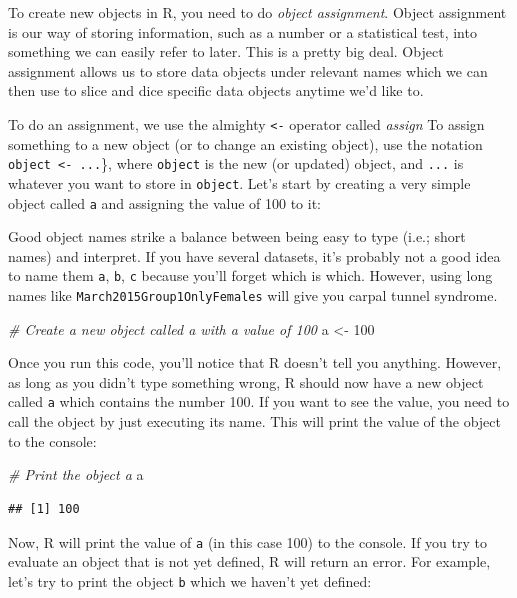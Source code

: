 \documentclass[
]{book}
\newenvironment{Shaded}{\begin{snugshade}}{\end{snugshade}}
\newcommand{\CommentTok}[1]{\textcolor[rgb]{0.56,0.35,0.01}{\textit{#1}}}
\newcommand{\DecValTok}[1]{\textcolor[rgb]{0.00,0.00,0.81}{#1}}
\newcommand{\NormalTok}[1]{#1}
\newcommand{\StringTok}[1]{\textcolor[rgb]{0.31,0.60,0.02}{#1}}
\begin{document}
To create new objects in R, you need to do \emph{object assignment}. Object assignment is our way of storing information, such as a number or a statistical test, into something we can easily refer to later. This is a pretty big deal. Object assignment allows us to store data objects under relevant names which we can then use to slice and dice specific data objects anytime we'd like to.

To do an assignment, we use the almighty \texttt{\textless{}-} operator called \emph{assign} To assign something to a new object (or to change an existing object), use the notation \texttt{object\ \textless{}-\ ...}\}, where \texttt{object} is the new (or updated) object, and \texttt{...} is whatever you want to store in \texttt{object}. Let's start by creating a very simple object called \texttt{a} and assigning the value of 100 to it:

Good object names strike a balance between being easy to type (i.e.; short names) and interpret. If you have several datasets, it's probably not a good idea to name them \texttt{a}, \texttt{b}, \texttt{c} because you'll forget which is which. However, using long names like \texttt{March2015Group1OnlyFemales} will give you carpal tunnel syndrome.

\begin{Shaded}
\begin{Highlighting}[]
\CommentTok{# Create a new object called a with a value of 100}
\NormalTok{a <-}\StringTok{ }\DecValTok{100}
\end{Highlighting}
\end{Shaded}

Once you run this code, you'll notice that R doesn't tell you anything. However, as long as you didn't type something wrong, R should now have a new object called \texttt{a} which contains the number 100. If you want to see the value, you need to call the object by just executing its name. This will print the value of the object to the console:

\begin{Shaded}
\begin{Highlighting}[]
\CommentTok{# Print the object a}
\NormalTok{a}
\end{Highlighting}
\end{Shaded}

\begin{verbatim}
## [1] 100
\end{verbatim}

Now, R will print the value of \texttt{a} (in this case 100) to the console. If you try to evaluate an object that is not yet defined, R will return an error. For example, let's try to print the object \texttt{b} which we haven't yet defined:
\end{document}
